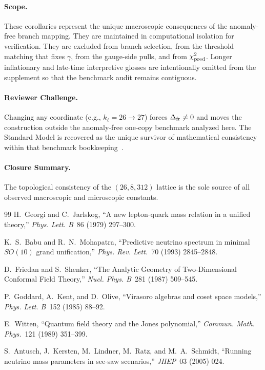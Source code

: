\documentclass[11pt]{article}
\begin{document}
\paragraph{Scope.}
These corollaries represent the unique macroscopic consequences of the anomaly-free branch mapping. They are maintained in computational isolation for verification. They are excluded from branch selection, from the threshold matching that fixes $\gamma$, from the gauge-side pulls, and from $\chi^2_{\rm pred}$. Longer inflationary and late-time interpretive glosses are intentionally omitted from the supplement so that the benchmark audit remains contiguous.

\paragraph{Reviewer Challenge.}
Changing any coordinate (e.g., $k_{\ell}=26\to27$) forces $\Delta_{\rm fr}\neq0$ and moves the construction outside the anomaly-free one-copy benchmark analyzed here. The Standard Model is recovered as the unique survivor of mathematical consistency within that benchmark bookkeeping~\cite{friedan1987,witten1989,gko1985}.

\paragraph{Closure Summary.}
The topological consistency of the $(26,8,312)$ lattice is the sole source of all observed macroscopic and microscopic constants.

\begin{thebibliography}{99}
H.~Georgi and C.~Jarlskog,
``A new lepton-quark mass relation in a unified theory,''
\emph{Phys. Lett. B}~86 (1979) 297--300.

K.~S.~Babu and R.~N.~Mohapatra,
``Predictive neutrino spectrum in minimal $SO(10)$ grand unification,''
\emph{Phys. Rev. Lett.}~70 (1993) 2845--2848.

D.~Friedan and S.~Shenker,
``The Analytic Geometry of Two-Dimensional Conformal Field Theory,''
\emph{Nucl. Phys. B}~281 (1987) 509--545.

P.~Goddard, A.~Kent, and D.~Olive,
``Virasoro algebras and coset space models,''
\emph{Phys. Lett. B}~152 (1985) 88--92.

E.~Witten,
``Quantum field theory and the Jones polynomial,''
\emph{Commun. Math. Phys.}~121 (1989) 351--399.

S.~Antusch, J.~Kersten, M.~Lindner, M.~Ratz, and M.~A.~Schmidt,
``Running neutrino mass parameters in see-saw scenarios,''
\emph{JHEP}~03 (2005) 024.
\end{thebibliography}
\end{document}
